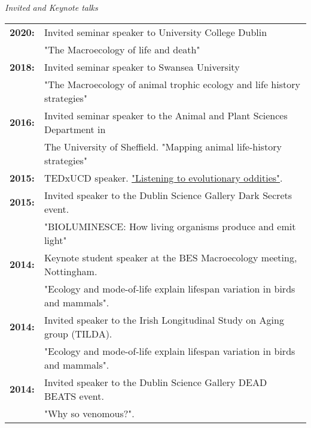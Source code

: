 \documentclass[10pt,a4paper]{article}
\begin{document}
\textit{Invited and Keynote talks}
\begin{tabular}{ll}
\textbf{2020:} & Invited seminar speaker to University College Dublin\\
& "The Macroecology of life and death"\\
\textbf{2018:} & Invited seminar speaker to Swansea University\\
& "The Macroecology of animal trophic ecology and life history strategies"\\
\textbf{2016:} & Invited seminar speaker to the Animal and Plant Sciences Department in\\
& The University of Sheffield. "Mapping animal life-history strategies"\\
\textbf{2015:} & TEDxUCD speaker. \href{https://www.youtube.com/watch?v=-CHtfWEKifY}{"Listening to evolutionary oddities"}.\\
\textbf{2015:} & Invited speaker to the Dublin Science Gallery Dark Secrets event.\\ 
& "BIOLUMINESCE: How living organisms produce and emit light"\\ 
\textbf{2014:} & Keynote student speaker at the BES Macroecology meeting, Nottingham.\\ 
&"Ecology and mode-of-life explain lifespan variation in birds and mammals".\\
\textbf{2014:} & Invited speaker to the Irish Longitudinal Study on Aging group (TILDA).\\ 
& "Ecology and mode-of-life explain lifespan variation in birds and mammals".\\
\textbf{2014:} & Invited speaker to the Dublin Science Gallery DEAD BEATS event.\\ 
& "Why so venomous?".\\
\end{tabular}

\smallskip
\end{document}
